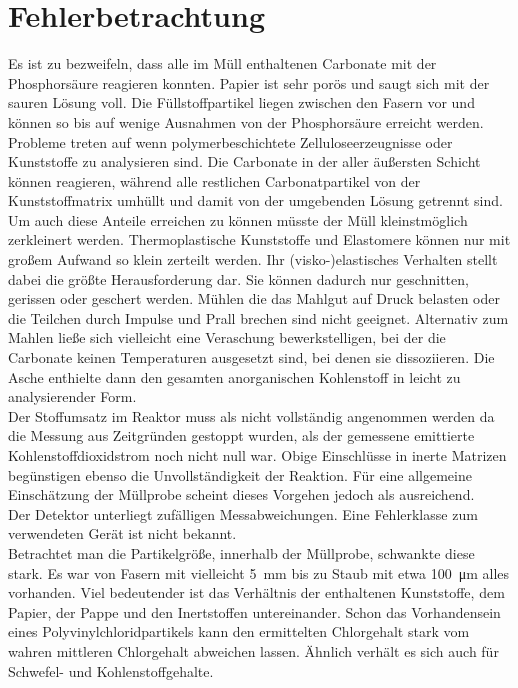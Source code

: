 \chapter{Fehlerbetrachtung}
\label{sec:fehler}

Es ist zu bezweifeln, dass alle im Müll enthaltenen Carbonate mit der Phosphorsäure reagieren konnten. Papier ist sehr porös und saugt sich mit der sauren Lösung voll. Die Füllstoffpartikel liegen zwischen den Fasern vor und können so bis auf wenige Ausnahmen von der Phosphorsäure erreicht werden. Probleme treten auf wenn polymerbeschichtete Zelluloseerzeugnisse oder Kunststoffe zu analysieren sind. Die Carbonate in der aller äußersten Schicht können reagieren, während alle restlichen Carbonatpartikel von der Kunststoffmatrix umhüllt und damit von der umgebenden Lösung getrennt sind. Um auch diese Anteile erreichen zu können müsste der Müll kleinstmöglich zerkleinert werden. Thermoplastische Kunststoffe und Elastomere können nur mit großem Aufwand so klein zerteilt werden. Ihr (visko-)elastisches Verhalten stellt dabei die größte Herausforderung dar. Sie können dadurch nur geschnitten, gerissen oder geschert werden. Mühlen die das Mahlgut auf Druck belasten oder die Teilchen durch Impulse und Prall brechen sind nicht geeignet.
Alternativ zum Mahlen ließe sich vielleicht eine Veraschung bewerkstelligen, bei der die Carbonate keinen Temperaturen ausgesetzt sind, bei denen sie dissoziieren. Die Asche enthielte dann den gesamten anorganischen Kohlenstoff in leicht zu analysierender Form.\\

Der Stoffumsatz im Reaktor muss als nicht vollständig angenommen werden da die Messung aus Zeitgründen gestoppt wurden, als der gemessene emittierte Kohlenstoffdioxidstrom noch nicht null war. Obige Einschlüsse in inerte Matrizen begünstigen ebenso die Unvollständigkeit der Reaktion. Für eine allgemeine Einschätzung der Müllprobe scheint dieses Vorgehen jedoch als ausreichend.\\
Der Detektor unterliegt zufälligen Messabweichungen. Eine Fehlerklasse zum verwendeten Gerät ist nicht bekannt.\\

Betrachtet man die Partikelgröße, innerhalb der Müllprobe, schwankte diese stark. Es war von Fasern mit vielleicht \SI{5}{\milli\meter} bis zu Staub mit etwa \SI{100}{\micro\meter} alles vorhanden. Viel bedeutender ist das Verhältnis der enthaltenen Kunststoffe, dem Papier, der Pappe und den Inertstoffen untereinander. Schon das Vorhandensein eines Polyvinylchloridpartikels kann den ermittelten Chlorgehalt stark vom wahren mittleren Chlorgehalt abweichen lassen. Ähnlich verhält es sich auch für Schwefel- und Kohlenstoffgehalte.\\

